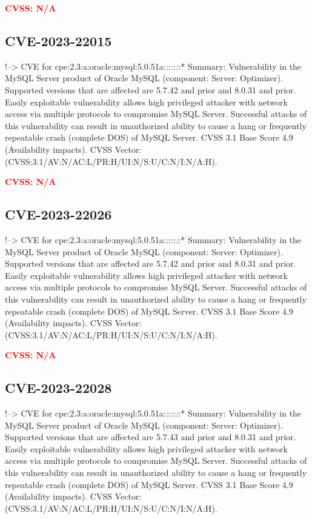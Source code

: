 \documentclass[a4paper, 12pt]{article}
\begin{document}
\textbf{\textcolor{red}{CVSS: N/A}}

\hypertarget{cve-2023-22015}{%
\subsection{CVE-2023-22015}\label{cve-2023-22015}}

!--\textgreater{} CVE for
cpe:2.3:a:oracle:mysql:5.0.51a:\emph{:}:\emph{:}:\emph{:}:* Summary:
Vulnerability in the MySQL Server product of Oracle MySQL (component:
Server: Optimizer). Supported versions that are affected are 5.7.42 and
prior and 8.0.31 and prior. Easily exploitable vulnerability allows high
privileged attacker with network access via multiple protocols to
compromise MySQL Server. Successful attacks of this vulnerability can
result in unauthorized ability to cause a hang or frequently repeatable
crash (complete DOS) of MySQL Server. CVSS 3.1 Base Score 4.9
(Availability impacts). CVSS Vector:
(CVSS:3.1/AV:N/AC:L/PR:H/UI:N/S:U/C:N/I:N/A:H).

\textbf{\textcolor{red}{CVSS: N/A}}

\hypertarget{cve-2023-22026}{%
\subsection{CVE-2023-22026}\label{cve-2023-22026}}

!--\textgreater{} CVE for
cpe:2.3:a:oracle:mysql:5.0.51a:\emph{:}:\emph{:}:\emph{:}:* Summary:
Vulnerability in the MySQL Server product of Oracle MySQL (component:
Server: Optimizer). Supported versions that are affected are 5.7.42 and
prior and 8.0.31 and prior. Easily exploitable vulnerability allows high
privileged attacker with network access via multiple protocols to
compromise MySQL Server. Successful attacks of this vulnerability can
result in unauthorized ability to cause a hang or frequently repeatable
crash (complete DOS) of MySQL Server. CVSS 3.1 Base Score 4.9
(Availability impacts). CVSS Vector:
(CVSS:3.1/AV:N/AC:L/PR:H/UI:N/S:U/C:N/I:N/A:H).

\textbf{\textcolor{red}{CVSS: N/A}}

\hypertarget{cve-2023-22028}{%
\subsection{CVE-2023-22028}\label{cve-2023-22028}}

!--\textgreater{} CVE for
cpe:2.3:a:oracle:mysql:5.0.51a:\emph{:}:\emph{:}:\emph{:}:* Summary:
Vulnerability in the MySQL Server product of Oracle MySQL (component:
Server: Optimizer). Supported versions that are affected are 5.7.43 and
prior and 8.0.31 and prior. Easily exploitable vulnerability allows high
privileged attacker with network access via multiple protocols to
compromise MySQL Server. Successful attacks of this vulnerability can
result in unauthorized ability to cause a hang or frequently repeatable
crash (complete DOS) of MySQL Server. CVSS 3.1 Base Score 4.9
(Availability impacts). CVSS Vector:
(CVSS:3.1/AV:N/AC:L/PR:H/UI:N/S:U/C:N/I:N/A:H).
\end{document}
